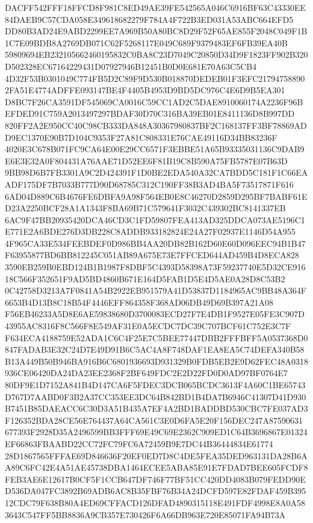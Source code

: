 \documentclass[UTF8,fontset=fandol,zihao=-4,a4paper]{ctexart}
\begin{document}
{{DACFF542FFF18FFCD8F981C8ED49AE39FE542565A046C6916BF63C43330EE84DAEB9C57CDA058E349618682279F784A4F722B3ED031A53ABC664EFD5
DD80B3AD24E9ABD2299EE7A969B50A80BC8D29F52F65AE855F2048C049F1B1C7E09BDB8A2769DB071C62F5268117E049C689F9379483EF6FB39EA40B
59809694EB232105662460195832C0BA8C23D7049C20850D34D9F1823FF902B320D502328EC67164229431D07927946B12451B0D0E681E70A63C5CB4
4D32F53B0301049C774FB5D2C89F9D530B018870DEDEB01F3EFC217947588902FA51E4774ADFFE093147BE4F4405B4953D9BD5DC976C4E6D9B5EA301
D8BC7F26CA3591DF545069CA0016C59CC1AD2C5DAE8910060174A2236F96BEFDED91C759A2013497297BDAF30D70C316BA39EB01E8411136D8B997DD
820FF2A2E950CC40C98CB333DA848A30367980837BF2C168137FF3BF78869ADD9EC1370E90B7D104C9353F27A81C808331E76CAE49116D34BB83236F
4020E3C678B071FC9CA64E00E29CC6571F3EBBE51A65B93335031136C9DAB9E6E3E32A0F804431A76AAE71D52EE6F81B19C8B590A75FB5787E07B63D
9BB98D6B7FB3301A9C2D424391F1D0BE2EDA540A32CA7BDD5C181F1C66EAADF175DF7B7033B777D90D68785C312C190FF38B3AD4BA5F73517871F616
6AD04D889C6B4676FE6DBFA9A98F564EB0E8C46270D2859D295BF7BABF61ED23A2250BCF28A1A1343F8BA69B71C579641F3032C439302BC8141337EB
6AC9F47BB20935420DCA46CD3C1FD59807FEA413AD325DDCA073AE5196C1E771E2A6BDE276D3DB228C8ADDB933182824E24A27F02937E1146D54A955
4F965CA33E534FEEBDEF0D986BB4AA20DB82B162D60E60D096EEC94B1B47F63955877BD6BB812245C051AB89A675E73E7FFCED644AD459B4D8ECA828
3590EB259B0EBD124B1B1987F8DBF5C4393D58398A73F59237740E5D32CE91618C566F352651F9AD5BD4860B671E164D5FAB1D5E4D5AE0A28D8C53B2
0C42758D3213A7F0841A54B2922EB951579A41D53837D1184965AC9BB48A364F6653B4D13B8C18B54F4446EFF864358F368AD06DB49D69B397A21A08
F56EB46233A5D8E6AE59838680D3700083ECD27F7E4DB1F9527E05FE3C907D43955AC8316F8C566F8E549AF31E0A5ECDC7DC39C707BCF61C752E3C7F
F634ECA4188759E52ADA1C6C4F25E7C5BEE77447DBB2FFFBFF5A0537368D0847FADAB3E32C24D7E49D91B6C5AC4A8F748DAF1EA8EA5C74DEFA340B58
B13A449B50B946BA916B6C6801936693D931329B0FDB5EB2E9D62FEC48A0318936CE06420DA24DA23EE2368F2BF649FDC2E2D22FD0D0AD97BF0764E7
80DF9E1D7152A841B4D147CA6F5FDEC3DCB065BCDC3613F4A60C1BE65743D767D7AABD0F3B2A37CC353EE3DC64B842BD1B4DA7B6946C41307D41D930
B7451B85DAEACC6C30D3A51B435A7EF4A2BD1BADDBD530CBC7FE037AD3F126352BDA28CE56E764437A64CA561C3E0D6FA5E20F156DEC247A87590631
677393F2928D35A2496599BB3FFF69E49C69E2362C909ED1C64B3696867E01324EF66863FBAABD22CC72FC79FC6A72459B9E7DC44B36444834E61774
28D1867565FFFAE69D846636F20EF0ED7D8C4DE5FEA35DED963131DA28B6AA89C6FC42E4A51AE45738DBA1464ECEE5ABA85E91E7FDAD7BEE605FCDF8
FEB3AE6E12617B0CF5F1CCB647DF746F77BF51CC420DD4083B079FEDD90ED536DA047FC3892B69ADB6AC8B35FBF76B34A24DCFD597E82FDAF459B395
12CDC79F638B80A4ED69CFFACD126DFAD4890315118E491FDF4998E8A0A583643C547FF5BB8836A9CB357E730426F6A66DB963E720E85071FA94B73A
}}
\end{document}
